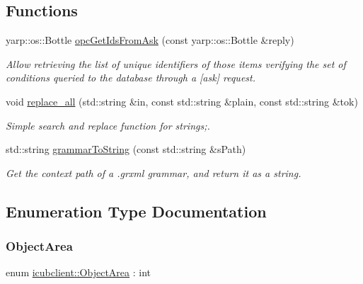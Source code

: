 \subsection*{Functions}
\begin{DoxyCompactItemize}
\item 
yarp\+::os\+::\+Bottle \hyperlink{group__icubclient__helpers_ga8acf76546a060893d573c697403e4196}{opc\+Get\+Ids\+From\+Ask} (const yarp\+::os\+::\+Bottle \&reply)
\begin{DoxyCompactList}\small\item\em Allow retrieving the list of unique identifiers of those items verifying the set of conditions queried to the database through a \mbox{[}ask\mbox{]} request. \end{DoxyCompactList}\item 
void \hyperlink{group__icubclient__helpers_ga2f96d56ceecf459408d38f01ebce1111}{replace\+\_\+all} (std\+::string \&in, const std\+::string \&plain, const std\+::string \&tok)
\begin{DoxyCompactList}\small\item\em Simple search and replace function for strings;. \end{DoxyCompactList}\item 
std\+::string \hyperlink{group__icubclient__helpers_gaf5d181da46b2680f90cb7b0df1fd7068}{grammar\+To\+String} (const std\+::string \&s\+Path)
\begin{DoxyCompactList}\small\item\em Get the context path of a .grxml grammar, and return it as a string. \end{DoxyCompactList}\end{DoxyCompactItemize}


\subsection{Enumeration Type Documentation}
\mbox{\label{namespaceicubclient_a582031d3e105cc59d614d15d30d22e65}} 
\subsubsection{\texorpdfstring{Object\+Area}{ObjectArea}}
{\footnotesize\ttfamily enum \hyperlink{namespaceicubclient_a582031d3e105cc59d614d15d30d22e65}{icubclient\+::\+Object\+Area} \+: int\hspace{0.3cm}{\ttfamily [strong]}}

